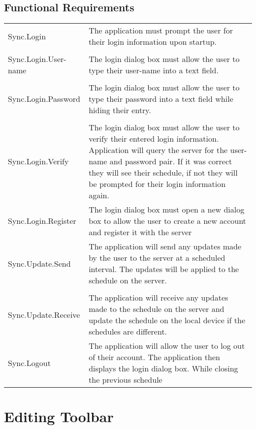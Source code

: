 \documentclass{scrreprt}
\begin{document}
\subsection{Functional Requirements}
\begin{center}
    \begin{longtable}{ | p{6cm} | p{9cm} | }
    \hline
    Sync.Login & The application must prompt the user for their login information
    upon startup.\\
    & \\
    Sync.Login.User-name & The login dialog box must allow the user to type their 
    user-name into a text field.\\
    & \\
    Sync.Login.Password & The login dialog box must allow the user to type their 
    password into a text field while hiding their entry.\\
    & \\
    Sync.Login.Verify & The login dialog box must allow the user to verify their
    entered login information. Application will query the server for the
    user-name and password pair. If it was correct they will see their schedule, 
    if not they will be prompted for their login information again.\\
    Sync.Login.Register & The login dialog box must open a new dialog box to allow the 
    user to create a new account and register it with the server\\
    \hline
    Sync.Update.Send & The application will send any updates made by the user to the 
    server at a scheduled interval. The updates will be applied to the schedule on the server.\\
    & \\
    Sync.Update.Receive & The application will receive any updates made to the schedule
    on the server and update the schedule on the local device if the schedules are different.\\
    \hline
    Sync.Logout & The application will allow the user to log out of their account. The
    application then displays the login dialog box. While closing the previous schedule\\
    \hline
    \end{longtable}
\end{center}

\section{Editing Toolbar}
\end{document}
